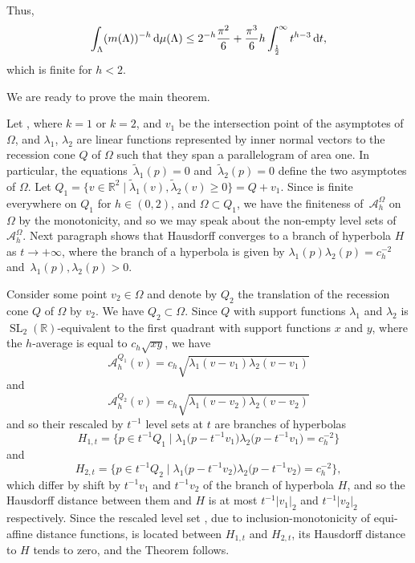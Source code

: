 \documentclass[pdftex]{sigma}
\numberwithin{equation}{section}
\theoremstyle{definition}
\begin{document}
Thus,{\samepage
\[\int_\Lambda (m(\Lambda))^{-h}\,{\rm d}\mu(\Lambda)\leq 2^{-h}\frac{\pi^2}{6}+\frac{\pi^3}{6}h\int_{\frac{1}{2}}^\infty t^{h-3} \,{\rm d}t,\]
which is finite for $h<2$.}

We are ready to prove the main theorem.

Let , where $k=1$ or $k=2$, and $v_1$ be the intersection point of the asymptotes of $\Omega$, and $\lambda_1$, $\lambda_2$ are linear functions represented by inner normal vectors to the recession cone $Q$ of $\Omega$ such that they span a parallelogram of area one. In particular, the equations~${\tilde\lambda_1(p)=0}$ and~${\tilde\lambda_2(p)=0}$ define the two asymptotes of $\Omega$. Let $Q_1=\bigl\{v\in\mathbb{R}^2\mid \tilde\lambda_1(v),\tilde\lambda_2(v)\geq 0\bigr\}=Q+v_1$. Since  is finite everywhere on $Q_1$ for $h\in(0,2)$, and $\Omega\subset Q_1$, we have the finiteness of~$\mathcal{A}^{\Omega}_h$ on $\Omega$ by the monotonicity, and so we may speak about the non-empty level sets of~$\mathcal{A}^{\Omega}_h$. Next paragraph shows that  Hausdorff converges to a branch of hyperbola $H$ as $t\rightarrow+\infty$, where the branch of a hyperbola is given by $\lambda_1(p)\lambda_2(p)=c_h^{-2}$ and~${\lambda_1(p),\lambda_2(p)>0}$.

Consider some point $v_2\in\Omega$ and denote by $Q_2$ the translation of the recession cone $Q$ of $\Omega$ by $v_2$. We have $Q_2\subset\Omega$. Since $Q$ with support functions $\lambda_1$ and $\lambda_2$ is $\operatorname{SL}_2(\mathbb{R})$-equivalent to the first quadrant  with support functions $x$ and $y$, where the $h$-average is equal to $c_h\sqrt{xy}$, we have
\[
\mathcal{A}^{Q_1}_h(v)=c_h\sqrt{\lambda_1(v-v_1)\lambda_2(v-v_1)}
\]
and
\[
\mathcal{A}^{Q_2}_h(v)=c_h\sqrt{\lambda_1(v-v_2)\lambda_2(v-v_2)}
\]
and so their rescaled by $t^{-1}$ level sets at $t$ are branches of hyperbolas
\[
H_{1,t}=\bigl\{p\in t^{-1}Q_1\mid \lambda_1\bigl(p-t^{-1}v_1\bigr)\lambda_2\bigl(p-t^{-1}v_1\bigr)=c_h^{-2}\bigr\}
\]
and
\[
H_{2,t}=\bigl\{p\in t^{-1}Q_2\mid \lambda_1\bigl(p-t^{-1}v_2\bigr)\lambda_2\bigl(p-t^{-1}v_2\bigr)=c_h^{-2}\bigr\},
\]
which differ by shift by $t^{-1}v_1$ and $t^{-1}v_2$ of the branch of hyperbola $H$, and so the Hausdorff distance between them and $H$ is at most $t^{-1}|v_1|_2$ and $t^{-1}|v_2|_2$ respectively. Since the rescaled level set , due to inclusion-monotonicity of equi-affine distance functions, is located between $H_{1,t}$ and $H_{2,t}$, its Hausdorff distance to $H$ tends to zero, and the Theorem follows.
\end{document}
